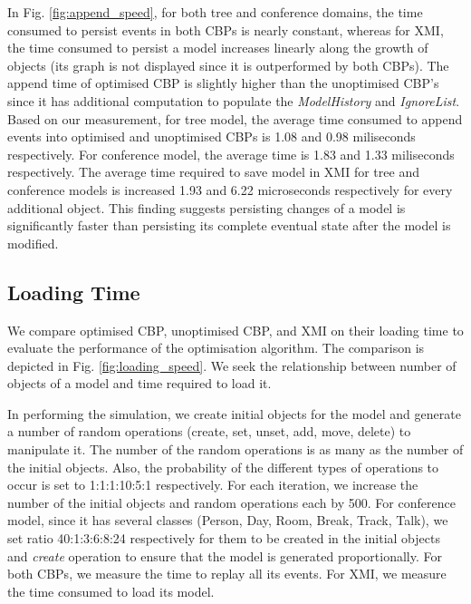 \documentclass{llncs}
\begin{document}
In Fig. \ref{fig:append_speed}, for both tree and conference domains, the time consumed to persist events in both CBPs is nearly constant, whereas for XMI, the time consumed to persist a model increases linearly along the growth of objects (its graph is not displayed since it is outperformed by both CBPs). The append time of optimised CBP is slightly higher than the unoptimised CBP's since it has additional computation to populate the \emph{ModelHistory} and \emph{IgnoreList}. Based on our measurement, for tree model, the average time consumed to append events into optimised and unoptimised CBPs is 1.08 and 0.98 miliseconds respectively. For conference model, the average time is 1.83 and 1.33 miliseconds respectively. The average time required to save model in XMI for tree and conference models is increased 1.93 and 6.22 microseconds respectively for every additional object. This finding suggests persisting changes of a model is significantly faster than persisting its complete eventual state after the model is modified.    

\subsection{Loading Time}
\label{subsec:loading_time_test}
We compare optimised CBP, unoptimised CBP, and XMI on their loading time to evaluate the performance of the optimisation algorithm. The  comparison is depicted in Fig. \ref{fig:loading_speed}. We seek the relationship between number of objects of a model and time required to load it. 

In performing the simulation, we create initial objects for the model and generate a number of random operations (create, set, unset, add, move, delete) to manipulate it. The number of the random operations is as many as the number of the initial objects. Also, the probability of the different types of operations to occur is set to 1:1:1:10:5:1 respectively. For each iteration, we increase the number of the initial objects and random operations each by 500. For conference model, since it has several classes (Person, Day, Room, Break, Track, Talk), we set ratio 40:1:3:6:8:24 respectively for them to be created in the initial objects and \emph{create} operation to ensure that the model is generated proportionally. For both CBPs, we measure the time to replay all its events. For XMI, we measure the time consumed to load its model.
\end{document}
